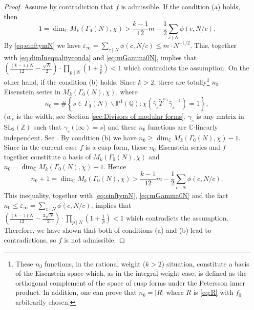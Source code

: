 \documentclass[12pt]{amsart}
\numberwithin{equation}{section}
\theoremstyle{plain}
\theoremstyle{definition}
\theoremstyle{remark}
\newcommand\rmi{\mathrm{i}}
\newcommand*\abs[1]{\lvert#1\rvert}
\newcommand\numC{\mathbb{C}}
\newcommand\projQ{\mathbb{P}^1(\mathbb{Q})}
\newcommand\slZ{\mathrm{SL}_2(\mathbb{Z})}
\begin{document}
\begin{proof}
Assume by contradiction that $f$ is admissible. If the condition (a) holds, then
\begin{equation}
\label{eq:dimInequalityconda}
1=\dim_\numC M_k(\Gamma_0(N), \chi)>\frac{k-1}{12}m-\frac{1}{2}\sum_{c\mid N}\phi(c,N/c).
\end{equation}
By \eqref{eq:einftymN} we have $\varepsilon_\infty=\sum_{c\mid N}\phi(c,N/c)\leq m\cdot N^{-1/2}$. This, together with \eqref{eq:dimInequalityconda} and \eqref{eq:mGamma0N}, implies that $\left(\frac{(k-1)N}{12}-\frac{\sqrt{N}}{2}\right)\cdot\prod_{p\mid N}\left(1+\frac{1}{p}\right)<1$ which contradicts the assumption. On the other hand, if the condition (b) holds. Since $k>2$, there are totally\footnote{These $n_0$ functions, in the rational weight ($k>2$) situation, constitute a basis of the Eisenstein space  which, as in the integral weight case, is defined as the orthogonal complement of the space of cusp forms under the Petersson inner product. In addition, one can prove that $n_0=\abs{R}$ where $R$ is \eqref{eq:R} with $f_0$ arbitrarily chosen.} $n_0$ Eisenstein series in $M_k(\Gamma_0(N), \chi)$, where
\begin{equation}
\label{eq:n0EisSeries}
n_0=\#\left\{s \in \Gamma_0(N)\backslash\projQ\colon \chi(\widetilde{\gamma_s}\widetilde{T}^{w_{s}}\widetilde{\gamma_s}^{-1})=1 \right\},
\end{equation}
($w_s$ is the width; see Section \ref{sec:Divisors of modular forms}, $\gamma_s$ is any matrix in $\slZ$ such that $\gamma_s(\rmi\infty)=s$) and these $n_0$ functions are $\numC$-linearly independent. See \cite[Theorem 3.3]{Zhu23}. By condition (b) we have $n_0\geq\dim_\numC M_k(\Gamma_0(N), \chi)-1$. Since in the current case $f$ is a cusp form, these $n_0$ Eisenstein series and $f$ together constitute a basis of $M_k(\Gamma_0(N), \chi)$ and $n_0=\dim_\numC M_k(\Gamma_0(N), \chi)-1$. Hence
\begin{equation}
\label{eq:dimInequalitycondb}
n_0+1=\dim_\numC M_k(\Gamma_0(N), \chi)>\frac{k-1}{12}m-\frac{1}{2}\sum_{c\mid N}\phi(c,N/c).
\end{equation}
This inequality, together with \eqref{eq:einftymN}, \eqref{eq:mGamma0N} and the fact $n_0\leq\varepsilon_\infty=\sum_{c\mid N}\phi(c,N/c)$, implies that $\left(\frac{(k-1)N}{12}-\frac{3\sqrt{N}}{2}\right)\cdot\prod_{p\mid N}\left(1+\frac{1}{p}\right)<1$ which contradicts the assumption. Therefore, we have shown that both of conditions (a) and (b) lead to contradictions, so $f$ is not admissible.


\end{proof}
\end{document}
